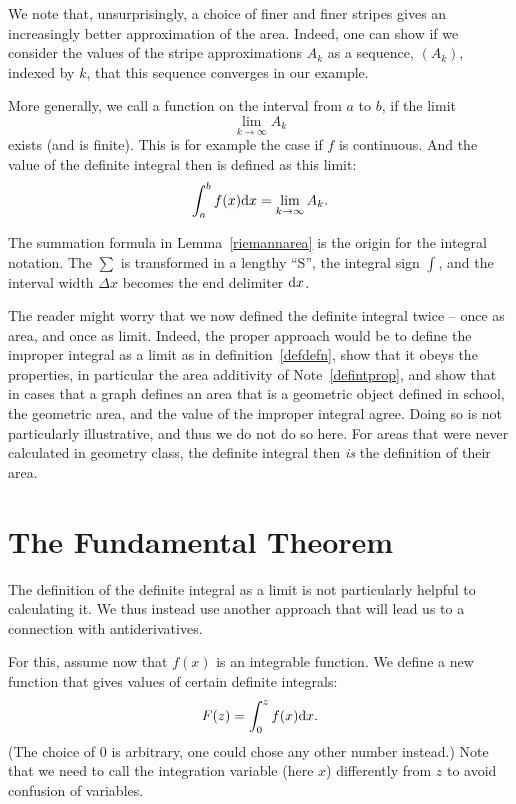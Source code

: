 We note that, unsurprisingly, a choice of finer and finer stripes gives an
increasingly better approximation of the area. Indeed, one can show if we
consider the values of the stripe approximations $A_k$ as a sequence,
$(A_k)$, indexed by $k$, that this sequence converges in our example.

\begin{defn}
\label{defdefn}
More generally, we call a function  on the interval from
$a$ to $b$, if the limit
\[
\lim_{k\to\infty} A_k
\]
exists (and is finite). This is for example the case if $f$ is continuous.
And the value of the definite integral then is defined as this limit:
\[
\int_a^b f(x){\mbox{d}}x=\lim_{k\to\infty} A_k.
\]
\end{defn}
\begin{note}
The summation formula in Lemma~\ref{riemannarea} is the origin for the integral
notation. The $\sum$ is transformed in a lengthy ``S'', the integral sign
$\int$, and the interval width $\Delta x$ becomes the end delimiter
${\mbox{d}}x$.
\end{note}

\begin{note}
The reader might worry that we now defined the definite integral twice -- once as
area, and once as limit. Indeed, the proper approach would be to define the
improper integral as a limit as in definition~\ref{defdefn}, show that it obeys
the properties, in particular the area additivity of Note~\ref{defintprop}, and
show that in cases that a graph defines an area that is a geometric object defined
in school, the geometric area, and the value of the improper integral agree. Doing
so is not particularly illustrative, and thus we do not do so here.
For areas that were never calculated in geometry class, the definite integral then
{\em is} the definition of their area.
\end{note}

\section{The Fundamental Theorem}

The definition of the definite integral as a limit is not particularly helpful to
calculating it. We thus instead use another approach that will lead us to a
connection with antiderivatives.

For this, assume now that $f(x)$ is an integrable function.
We define a new function that gives values of certain definite integrals:
\[
F(z)=\int_0^z f(x){\mbox{d}}x.
\]
(The choice of $0$ is arbitrary, one could chose any other number instead.)
Note that we need to call the integration variable (here $x$) differently from $z$
to avoid confusion of variables.

